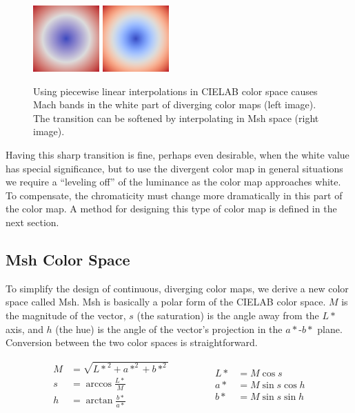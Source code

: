 \documentclass{llncs}
\newcommand{\Lab}{CIELAB\xspace}
\newcommand{\Msh}{Msh\xspace}
\begin{document}
\begin{figure}
  \centering
  \includegraphics[width=1in]{images/Cool2WarmLabRadial}
  \qquad
  \includegraphics[width=1in]{images/Cool2WarmRadial}
  \caption{Using piecewise linear interpolations in \Lab color space causes
    Mach bands in the white part of diverging color maps (left image).  The
    transition can be softened by interpolating in \Msh space (right image).}
  \label{fig:LinearMachBands}
\end{figure}

Having this sharp transition is fine, perhaps even desirable, when the
white value has special significance, but to use the divergent color map in
general situations we require a ``leveling off'' of the luminance as the
color map approaches white.  To compensate, the chromaticity must change
more dramatically in this part of the color map.  A method for designing
this type of color map is defined in the next section.

\subsection{\Msh Color Space}
\label{sec:MshColorSpace}

To simplify the design of continuous, diverging color maps, we derive a new
color space called \Msh.  \Msh is basically a polar form of the \Lab color
space.  $M$ is the magnitude of the vector, $s$ (the saturation) is the
angle away from the $L*$ axis, and $h$ (the hue) is the angle of the
vector's projection in the $a*$-$b*$ plane.  Conversion between the two
color spaces is straightforward.

\begin{equation}
  \begin{split}
    M &= \sqrt{{L*}^2 + a*^2 + b*^2} \\
    s &= \arccos \frac{L*}{M} \\
    h &= \arctan \frac{b*}{a*}
  \end{split}
  \qquad\qquad
  \begin{split}
    L* &= M \cos s \\
    a* &= M \sin s \cos h \\
    b* &= M \sin s \sin h
  \end{split}
  \label{eqn:LabMshConvert}
\end{equation}
\end{document}
